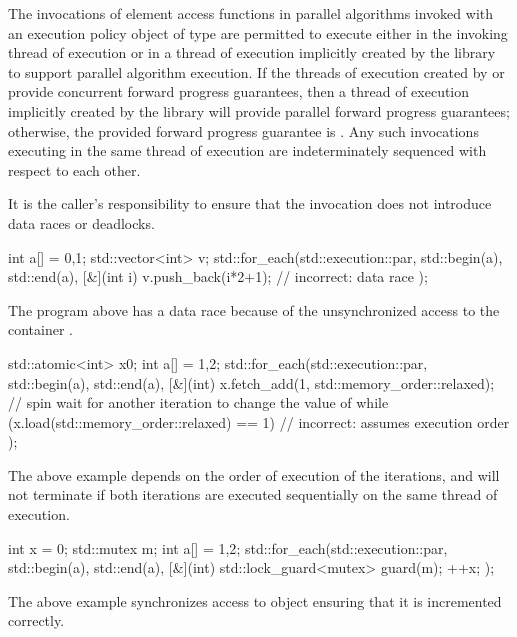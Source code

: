\pnum
The invocations of element access functions in parallel algorithms invoked with
an execution policy object of type 
are permitted to execute either
in the invoking thread of execution or
in a thread of execution implicitly created by the library
to support parallel algorithm execution.
If the threads of execution created by 
or 
provide concurrent forward progress guarantees,
then a thread of execution implicitly created by the library will provide
parallel forward progress guarantees;
otherwise, the provided forward progress guarantee is
.
Any such invocations executing in the same thread of execution
are indeterminately sequenced with respect to each other.
\begin{note}
It is the caller's responsibility to ensure
that the invocation does not introduce data races or deadlocks.
\end{note}
\begin{example}
\begin{codeblock}
int a[] = {0,1};
std::vector<int> v;
std::for_each(std::execution::par, std::begin(a), std::end(a), [&](int i) {
  v.push_back(i*2+1);                   // incorrect: data race
});
\end{codeblock}
The program above has a data race because of the unsynchronized access to the
container .
\end{example}
\begin{example}
\begin{codeblock}
std::atomic<int> x{0};
int a[] = {1,2};
std::for_each(std::execution::par, std::begin(a), std::end(a), [&](int) {
  x.fetch_add(1, std::memory_order::relaxed);
  // spin wait for another iteration to change the value of 
  while (x.load(std::memory_order::relaxed) == 1) { }           // incorrect: assumes execution order
});
\end{codeblock}
The above example depends on the order of execution of the iterations, and
will not terminate if both iterations are executed sequentially
on the same thread of execution.
\end{example}
\begin{example}
\begin{codeblock}
int x = 0;
std::mutex m;
int a[] = {1,2};
std::for_each(std::execution::par, std::begin(a), std::end(a), [&](int) {
  std::lock_guard<mutex> guard(m);
  ++x;
});
\end{codeblock}
The above example synchronizes access to object 
ensuring that it is incremented correctly.
\end{example}

